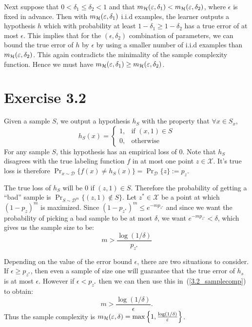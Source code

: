 Next suppose that $0 < \delta_1 \leq \delta_2 < 1$ and that
$m_{\mathcal{H}}(\varepsilon, \delta_1) < m_{\mathcal{H}}(\varepsilon, \delta_2)$, where
$\epsilon$ is fixed in advance. Then with $m_{\mathcal{H}}(\varepsilon, \delta_1)$
i.i.d examples, the learner outputs a hypothesis $h$ which with probability at
least $1 - \delta_1 \geq 1 - \delta_2$ has a true error of at most $\epsilon$.
This implies that for the $(\epsilon, \delta_2)$ combination of parameters, we
can bound the true error of $h$ by $\epsilon$ by using a smaller number of
i.i.d examples than $m_{\mathcal{H}}(\varepsilon, \delta_2)$. This again contradicts
the minimality of the sample complexity function. Hence we must have
$m_{\mathcal{H}}(\varepsilon, \delta_1) \geq m_{\mathcal{H}}(\varepsilon, \delta_2)$.

\section*{Exercise 3.2}

Given a sample $S$, we output a hypothesis $h_S$ with the property that
$\forall x \in S_x$,
\[
    h_S(x) = \left \{ \begin{array}{rl}
                            1, & \text{if $(x, 1) \in S$} \\
                            0, & \text{otherwise}
                      \end{array} \right .
\]
For any sample $S$, this hypothesis has an empirical loss of $0$. Note
that $h_S$ disagrees with the true labeling function $f$ in at most one point
$z \in \mathcal{X}$. It's true loss is therefore
$\Pr_{x \sim \mathcal{D}} \{ f(x) \neq h_S(x)\} = \Pr_{\mathcal{D}} \{z\} := p_z$.

The true loss of $h_S$ will be $0$ if $(z, 1) \in S$. Therefore the probability
of getting a ``bad'' sample is $\Pr_{S \sim \mathcal{D}^m}\{(z, 1) \notin S\}$.
Let $z^{*} \in \mathcal{X}$ be a point at which $(1 - p_z)^m$ is maximized. Since
$(1 - p_{z^{*}})^m \leq e^{- m p_{z^{*}}}$ and since we want the probability of
picking a bad sample to be at most $\delta$, we want $e^{- m p_{z^{*}}} < \delta$,
which gives us the sample size to be:
\begin{equation}
\label{3.2_samplecomp}
	m  > \frac{\log (1 / \delta)}{p_{z^{*}}}
\end{equation}

Depending on the value of the error bound $\epsilon$, there are two situations
to consider. If $\epsilon \geq p_{z^{*}}$, then even a sample of size one will
guarantee that the true error of $h_s$ is at most $\epsilon$. However if
$\epsilon < p_{z^{*}}$ then we can then use this in~(\ref{3.2_samplecomp})
to obtain:
\[
    m > \frac{\log (1 / \delta)}{\epsilon}.
\]
Thus the sample complexity is $m_{\mathcal{H}}(\varepsilon, \delta) =
\max \left \{1, \frac{\log (1 / \delta)}{\varepsilon} \right \}$.


